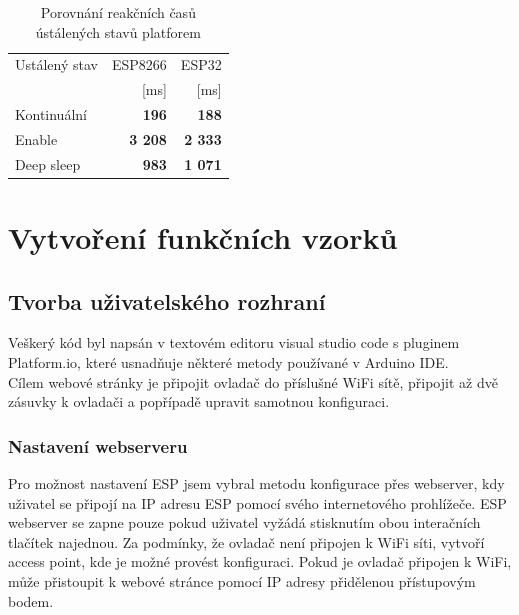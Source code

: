\documentclass[a4paper, 12pt]{report}
\begin{document}
    \begin{table}[h]
        \centering
        \caption{Porovnání reakčních časů ústálených stavů platforem}
        \begin{tabular}{||l|r r||}
            \hline
            Ustálený stav & ESP8266        & ESP32          \\
            & [ms]           & [ms]           \\
            \hline
            Kontinuální   & \textbf{196}   & \textbf{188}   \\
            Enable        & \textbf{3 208} & \textbf{2 333} \\
            Deep sleep    & \textbf{983}   & \textbf{1 071} \\
            \hline
        \end{tabular}
        \label{tab:porovnani-klidove-rezimy-cas}
    \end{table}




    \chapter{Vytvoření funkčních vzorků}


    \section{Tvorba uživatelského rozhraní}
    Veškerý kód byl napsán v textovém editoru visual studio code s pluginem Platform.io, které usnadňuje některé metody používané v Arduino IDE.\\
    Cílem webové stránky je připojit ovladač do příslušné WiFi sítě, připojit až dvě zásuvky k ovladači a popřípadě upravit samotnou konfiguraci.


    \subsection{Nastavení webserveru}
    Pro možnost nastavení ESP jsem vybral metodu konfigurace přes webserver, kdy uživatel se připojí na IP adresu ESP pomocí svého internetového prohlížeče. ESP webserver se zapne pouze pokud uživatel vyžádá stisknutím obou interačních tlačítek najednou. Za podmínky, že ovladač není připojen k WiFi síti, vytvoří access point, kde je možné provést konfiguraci. Pokud je ovladač připojen k WiFi, může přistoupit k webové stránce pomocí IP adresy přidělenou přístupovým bodem.
\end{document}
